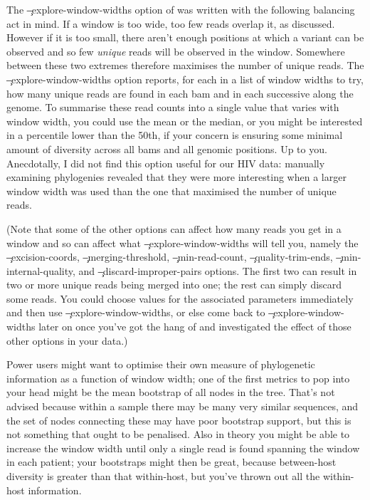 The \c{--explore-window-widths} option of \pmt was written with the following balancing act in mind.
If a window is too wide, too few reads overlap it, as discussed.
However if it is too small, there aren't enough positions at which a variant can be observed and so few {\it unique} reads will be observed in the window.
Somewhere between these two extremes therefore maximises the number of unique reads.
The \c{--explore-window-widths} option reports, for each in a list of window widths to try, how many unique reads are found in each bam and in each successive along the genome.
To summarise these read counts into a single value that varies with window width, you could use the mean or the median, or you might be interested in a percentile lower than the 50th, if your concern is ensuring some minimal amount of diversity across all bams and all genomic positions.
Up to you.
Anecdotally, I did not find this option useful for our HIV data: manually examining phylogenies revealed that they were more interesting when a larger window width was used than the one that maximised the number of unique reads.

(Note that some of the other options can affect how many reads you get in a window and so can affect what \c{--explore-window-widths} will tell you, namely the \c{--excision-coords}, \c{--merging-threshold}, \c{--min-read-count}, \c{--quality-trim-ends}, \c{--min-internal-quality}, and \c{--discard-improper-pairs} options.
The first two can result in two or more unique reads being merged into one; the rest can simply discard some reads.
You could choose values for the associated parameters immediately and then use \c{--explore-window-widths}, or else come back to \c{--explore-window-widths} later on once you've got the hang of \pmt and investigated the effect of those other options in your data.)  

Power users might want to optimise their own measure of phylogenetic information as a function of window width; one of the first metrics to pop into your head might be the mean bootstrap of all nodes in the tree.
That's not advised because within a sample there may be many very similar sequences, and the set of nodes connecting these may have poor bootstrap support, but this is not something that ought to be penalised.
Also in theory you might be able to increase the window width until only a single read is found spanning the window in each patient; your bootstraps might then be great, because between-host diversity is greater than that within-host, but you've thrown out all the within-host information.


